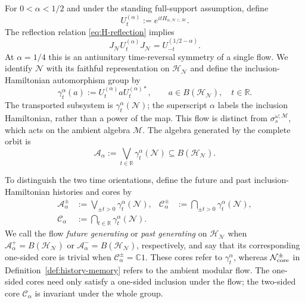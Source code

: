\documentclass[a4paper,11pt]{article}
\theoremstyle{definition}
\newcommand{\nn}{\nonumber}
\newcommand{\mN}{\mathcal{N}}
\newcommand{\mH}{\mathcal{H}}
\newcommand{\mM}{\mathcal{M}}
\begin{document}
For $0<\alpha<1/2$ and under the standing full-support assumption, define
\begin{equation}
    U_t^{(\alpha)}:=e^{itH_{\alpha,\mN\subset\mM}}.
\end{equation}
The reflection relation \eqref{eq:H-reflection} implies
\begin{equation}
    J_{\mN}U_t^{(\alpha)}J_{\mN}=U_{-t}^{(1/2-\alpha)}.
    \label{eq:H-quarter-time-reversal}
\end{equation}
At $\alpha=1/4$ this is an antiunitary time-reversal symmetry of a single flow. We identify $\mN$ with its faithful representation on
$\mH_{\mN}$ and define the inclusion-Hamiltonian automorphism group by
\begin{equation}
    \gamma_t^\alpha(a)
    :=U_t^{(\alpha)}aU_t^{(\alpha)*},
    \qquad a\in B(\mH_{\mN}),\quad t\in\mathbb R.
    \label{eq:N-alpha-t-general}
\end{equation}
The transported subsystem is $\gamma_t^\alpha(\mN)$; the superscript
$\alpha$ labels the inclusion Hamiltonian, rather than a power of the map.
This flow is distinct from $\sigma_s^{\omega;\mM}$, which acts on the
ambient algebra $\mM$.
The algebra generated by the complete orbit is
\begin{equation}
    \mathcal A_\alpha
    :=
    \bigvee_{t\in\mathbb R}
    \gamma_t^\alpha(\mN)
    \subseteq B(\mH_{\mN}).
    \label{eq:A-alpha-general}
\end{equation}

To distinguish the two time orientations, define the future and past
inclusion-Hamiltonian histories and cores by
\begin{align}
    \mathcal A_\alpha^\pm
    &:=\bigvee_{\pm t>0}\gamma_t^\alpha(\mN),
    &
    \mathcal C_\alpha^\pm
    &:=\bigcap_{\pm t>0}\gamma_t^\alpha(\mN),\nn\\
    \mathcal C_\alpha
    &:=\bigcap_{t\in\mathbb R}\gamma_t^\alpha(\mN).
    \label{eq:Halpha-one-sided-histories-cores}
\end{align}
We call the flow \emph{future generating} or \emph{past generating} on
$\mH_{\mN}$ when $\mathcal A_\alpha^+=B(\mH_{\mN})$ or
$\mathcal A_\alpha^-=B(\mH_{\mN})$, respectively, and say that its
corresponding one-sided core is trivial when
$\mathcal C_\alpha^\pm=\mathbb C1$. These cores refer to
$\gamma_t^\alpha$, whereas $\mN_{\rm core}^{\pm}$ in
Definition~\ref{def:history-memory} refers to the ambient modular flow.
The one-sided cores need only satisfy a one-sided inclusion under the
flow; the two-sided core $\mathcal C_\alpha$ is invariant under the
whole group.
\end{document}
